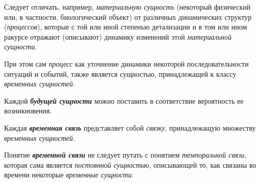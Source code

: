 Следует отличать, например, \textit{материальную сущность} (некоторый физический или, в частности, биологический объект) от различных динамических структур (\textit{процессов}), которые с той или иной степенью детализации и в том или ином ракурсе отражают (описывают) динамику изменений этой \textit{материальной сущности}. 
			
При этом сам \textit{процесс} как уточнение динамики некоторой последовательности ситуаций и событий, также является сущностью, принадлежащей к классу \textit{временных сущностей}.
		
\begin{SCn}
		
		
\end{SCn}

Каждой \textbf{\textit{будущей сущности}} можно поставить в соответствие вероятность ее возникновения.
	
\begin{SCn}
\end{SCn}

Каждая \textbf{\textit{временная связь}} представляет собой \textit{связку}, принадлежащую множеству \textit{временных сущностей}.
			
Понятие \textbf{\textit{временной связи}} не следует путать с понятием \textit{темпоральной связи}, которая сама является \textit{постоянной сущностью}, описывающей то, как связаны во времени некоторые \textit{временные сущности}.

\begin{SCn}
\end{SCn}

